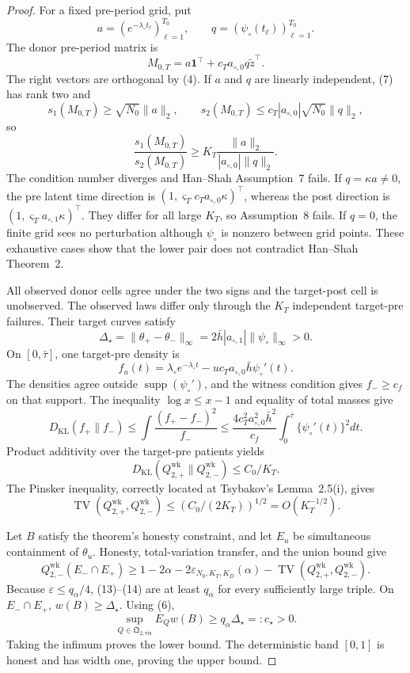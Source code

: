 \documentclass{article}
\begin{document}
\begin{proof}
For a fixed pre-period grid, put
\[
 a=(e^{-\lambda_\circ t_\ell})_{\ell=1}^{T_0},
 \qquad q=(\psi_\circ(t_\ell))_{\ell=1}^{T_0}.
\]
The donor pre-period matrix is
\[
 M_{0,T}=a\mathbf1^\top+c_Ta_{\circ,0}q\widetilde z^\top. \tag{7}
\]
The right vectors are orthogonal by (4).  If \(a\) and \(q\) are linearly independent, (7) has rank two and
\[
 s_1(M_{0,T})\ge\sqrt{N_0}\|a\|_2,
 \qquad
 s_2(M_{0,T})\le c_T|a_{\circ,0}|\sqrt{N_0}\|q\|_2,
\]
so
\[
 \frac{s_1(M_{0,T})}{s_2(M_{0,T})}
 \ge K_T\frac{\|a\|_2}{|a_{\circ,0}|\|q\|_2}.          \tag{8}
\]
The condition number diverges and Han--Shah Assumption~7 fails.  If \(q=\kappa a\ne0\), the pre latent time direction is \((1,\varsigma_Tc_Ta_{\circ,0}\kappa)^\top\), whereas the post direction is \((1,\varsigma_Ta_{\circ,1}\kappa)^\top\).  They differ for all large \(K_T\), so Assumption~8 fails.  If \(q=0\), the finite grid sees no perturbation although \(\psi_\circ\) is nonzero between grid points.  These exhaustive cases show that the lower pair does not contradict Han--Shah Theorem~2.

All observed donor cells agree under the two signs and the target-post cell is unobserved.  The observed laws differ only through the \(K_T\) independent target-pre failures.  Their target curves satisfy
\[
 \Delta_\star=\|\theta_+-\theta_-\|_\infty
 =2\bar h|a_{\circ,1}|\|\psi_\circ\|_\infty>0.        \tag{9}
\]
On \([0,\bar\tau]\), one target-pre density is
\[
 f_u(t)=\lambda_\circ e^{-\lambda_\circ t}
 -u c_Ta_{\circ,0}\bar h\psi_\circ'(t).                \tag{10}
\]
The densities agree outside \(\operatorname{supp}(\psi_\circ')\), and the witness condition gives \(f_-\ge c_f\) on that support.  The inequality \(\log x\le x-1\) and equality of total masses give
\[
 D_{\mathrm{KL}}(f_+\|f_-)
 \le\int\frac{(f_+-f_-)^2}{f_-}
 \le\frac{4c_T^2a_{\circ,0}^2\bar h^2}{c_f}
 \int_0^{\bar\tau}\{\psi_\circ'(t)\}^2dt.             \tag{11}
\]
Product additivity over the target-pre patients yields
\[
 D_{\mathrm{KL}}(Q_{2,+}^{\mathrm{wk}}\|Q_{2,-}^{\mathrm{wk}})
 \le C_0/K_T.                                           \tag{12}
\]
The Pinsker inequality, correctly located at Tsybakov's Lemma~2.5(i), gives
\[
 \operatorname{TV}(Q_{2,+}^{\mathrm{wk}},Q_{2,-}^{\mathrm{wk}})
 \le(C_0/(2K_T))^{1/2}=O(K_T^{-1/2}).                   \tag{13}
\]

Let \(B\) satisfy the theorem's honesty constraint, and let \(E_u\) be simultaneous containment of \(\theta_u\).  Honesty, total-variation transfer, and the union bound give
\[
 Q_{2,-}^{\mathrm{wk}}(E_-\cap E_+)
 \ge1-2\alpha-2\varepsilon_{N_0,K_T,K_D}(\alpha)
 -\operatorname{TV}(Q_{2,+}^{\mathrm{wk}},Q_{2,-}^{\mathrm{wk}}). \tag{14}
\]
Because \(\varepsilon\le q_\alpha/4\), (13)--(14) are at least \(q_\alpha\) for every sufficiently large triple.  On \(E_-\cap E_+\), \(w(B)\ge\Delta_\star\).  Using (6),
\[
 \sup_{Q\in\mathfrak Q_{2,\mathrm{vis}}}E_Qw(B)
 \ge q_\alpha\Delta_\star=:c_\star>0.                 \tag{15}
\]
Taking the infimum proves the lower bound.  The deterministic band \([0,1]\) is honest and has width one, proving the upper bound.


\end{proof}
\end{document}
